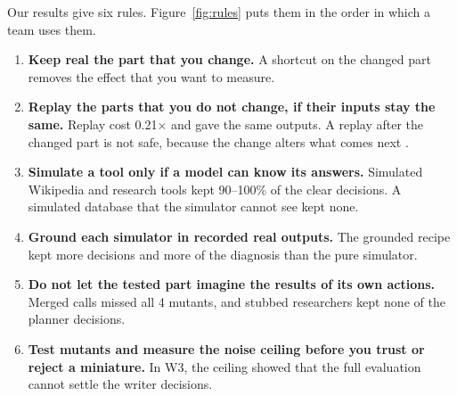 Our results give six rules. Figure~\ref{fig:rules} puts them in the order in which a team uses
them.
\begin{enumerate}
  \item \textbf{Keep real the part that you change.} A shortcut on the changed part removes the
  effect that you want to measure.
  \item \textbf{Replay the parts that you do not change, if their inputs stay the same.} Replay
  cost 0.21$\times$ and gave the same outputs. A replay after the changed part is not safe,
  because the change alters what comes next \citep{gonuguntla2026replaygap}.
  \item \textbf{Simulate a tool only if a model can know its answers.} Simulated Wikipedia and
  research tools kept 90--100\% of the clear decisions. A simulated database that the simulator
  cannot see kept none.
  \item \textbf{Ground each simulator in recorded real outputs.} The grounded recipe kept more
  decisions and more of the diagnosis than the pure simulator.
  \item \textbf{Do not let the tested part imagine the results of its own actions.} Merged calls
  missed all 4 mutants, and stubbed researchers kept none of the planner decisions.
  \item \textbf{Test mutants and measure the noise ceiling before you trust or reject a
  miniature.} In W3, the ceiling showed that the full evaluation cannot settle the writer
  decisions.
\end{enumerate}
